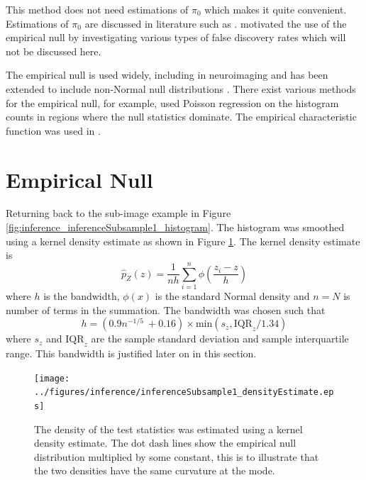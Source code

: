 This method does not need estimations of $\pi_0$ which makes it quite convenient. Estimations of $\pi_0$ are discussed in literature such as \cite{benjamini2000adaptive, pounds2003estimating, storey2003statistical, pounds2004improving, langaas2005estimating, durnez2014posthoc}. \cite{efron2004large} motivated the use of the empirical null by investigating various types of false discovery rates \citep{storey2002direct, storey2003positive, efron2002empirical, efron2007size} which will not be discussed here.

The empirical null is used widely, including in neuroimaging \citep{schwartzman2008false, schwartzman2009empirical} and has been extended to include non-Normal null distributions \citep{schwartzman2008false, schwartzman2008empirical}. There exist various methods for the empirical null, for example, \cite{schwartzman2008empirical} used Poisson regression on the histogram counts in regions where the null statistics dominate. The empirical characteristic function was used in \cite{jin2007estimating}.

\section{Empirical Null}

Returning back to the sub-image example in Figure \ref{fig:inference_inferenceSubsample1_histogram}. The histogram was smoothed using a kernel density estimate \citep{parzen1962on, friedman2001elements} as shown in Figure \ref{fig:inference_inferenceSubsample1_densityEstimate}. The kernel density estimate \citep{parzen1962on} is
\begin{equation}
  \widehat{p}_Z(z)=
  \frac{1}{nh}
  \sum_{i=1}^n\phi\left(
    \dfrac{z_i-z}{h}
  \right)
  \label{eq:inference_kernel_density_estimate}
\end{equation}
where $h$ is the bandwidth, $\phi(x)$ is the standard Normal density and $n=N$ is number of terms in the summation. The bandwidth was chosen such that
\begin{equation}
  h = (0.9n^{-1/5}\ + 0.16) \times \text{min}\left(s_z,\text{IQR}_z/1.34\right)
  \label{eq:inference_ourruleofthumb}
\end{equation}
where $s_z$ and $\text{IQR}_z$ are the sample standard deviation and sample interquartile range. This bandwidth is justified later on in this section.

\begin{figure}
  \centering
  \texttt{[image: ../figures/inference/inferenceSubsample1\_densityEstimate.eps]}
  \caption{The density of the test statistics was estimated using a kernel density estimate. The dot dash lines show the empirical null distribution multiplied by some constant, this is to illustrate that the two densities have the same curvature at the mode.}
  \label{fig:inference_inferenceSubsample1_densityEstimate}
\end{figure}

